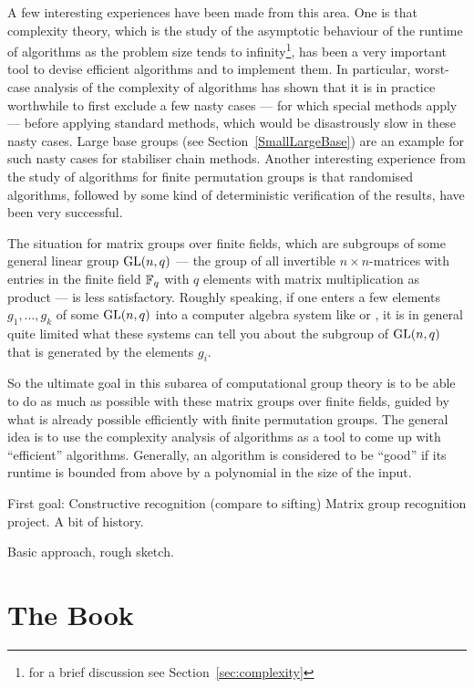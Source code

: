 A few interesting experiences have been made from this area. One is that 
complexity theory,
which is the study of the asymptotic behaviour of the runtime of algorithms 
as the problem size tends to infinity\footnote{for a brief discussion see 
Section~\ref{sec:complexity}}, has been a very important tool to
devise efficient algorithms and to implement them. In particular,
worst-case analysis of the complexity of algorithms has shown that
it is in practice worthwhile to first exclude a few nasty cases ---
for which special methods apply --- before applying standard methods,
which would be disastrously slow in these nasty cases. Large base
groups (see Section~\ref{SmallLargeBase}) are an example for such
nasty cases for stabiliser chain methods.
Another interesting
experience from the study of algorithms for finite permutation groups 
is that randomised algorithms, followed by some kind of
deterministic verification of the results, have been very successful.

The situation for matrix groups over finite fields, which are subgroups 
of some general linear group $\GL(n,q)$ --- the group of all
invertible $n \times n$-matrices with entries in the finite field
$\mathbb{F}_q$ with $q$ elements with matrix multiplication as product ---
is less satisfactory. Roughly speaking, if one enters a few
elements $g_1, \ldots, g_k$ of some $\GL(n,q)$ into a computer algebra 
system like {\GAP} or {\MAGMA}, it is in general quite limited what
these systems can tell you about the subgroup of $\GL(n,q)$ that is
generated by the elements $g_i$.

So the ultimate goal in this subarea of computational group theory
is to be able to do as much as possible with these matrix groups over
finite fields, guided by what is already possible efficiently with
finite permutation groups. The general idea is to use the complexity
analysis of algorithms as a tool to come up with ``efficient''
algorithms. Generally, an algorithm is considered to be ``good'' if
its runtime is bounded from above by a polynomial in the size of the
input.

First goal: Constructive recognition (compare to sifting)
Matrix group recognition project. A bit of history.

Basic approach, rough sketch.

\section{The Book}

